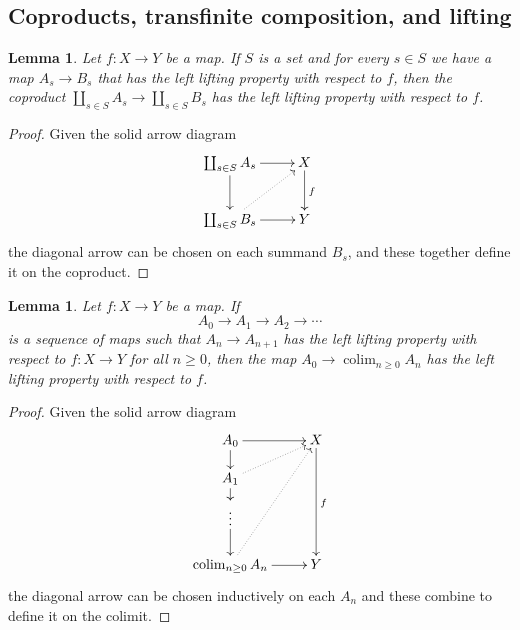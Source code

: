 \documentclass{amsart}
\numberwithin{equation}{section}
\theoremstyle{slplain}
\newtheorem{lem}[equation]{Lemma}
\theoremstyle{definition}
\theoremstyle{remark}
\DeclareMathOperator*{\colim}{colim}
\begin{document}
\subsection{Coproducts, transfinite composition, and lifting}
\label{sec:CoprodLift}

\begin{lem}
  \label{lem:coprodLLP}
  Let $f\colon X \to Y$ be a map.  If $S$ is a set and for every $s
  \in S$ we have a map $A_{s} \to B_{s}$ that has the left lifting
  property with respect to $f$, then the coproduct $\coprod_{s\in S}
  A_{s} \to \coprod_{s\in S} B_{s}$ has the left lifting property with
  respect to $f$.
\end{lem}

\begin{proof}
  Given the solid arrow diagram
  \begin{displaymath}
    \xymatrix{
      {\coprod_{s\in S} A_{s}} \ar[r] \ar[d]
      & {X} \ar[d]^{f}\\
      {\coprod_{s\in S} B_{s}} \ar[r] \ar@{..>}[ur]
      & {Y}
    }
  \end{displaymath}
  the diagonal arrow can be chosen on each summand $B_{s}$, and these
  together define it on the coproduct.
\end{proof}

\begin{lem}
  \label{lem:compLLP}
  Let $f\colon X \to Y$ be a map.  If
  \begin{displaymath}
    A_{0} \to A_{1} \to A_{2} \to \cdots
  \end{displaymath}
  is a sequence of maps such that $A_{n} \to A_{n+1}$ has the left
  lifting property with respect to $f\colon X \to Y$ for all $n \ge
  0$, then the map $A_{0} \to \colim_{n\ge 0} A_{n}$ has the left
  lifting property with respect to $f$.
\end{lem}

\begin{proof}
  Given the solid arrow diagram
  \begin{displaymath}
    \xymatrix@R=3ex{
      {A_{0}} \ar[r] \ar[d]
      & {X} \ar[ddd]^{f}\\
      {A_{1}} \ar[d] \ar@{..>}[ur]\\
      {\vdots} \ar[d]\\
      {\colim_{n\ge 0} A_{n}} \ar[r] \ar@{..>}[uuur]
      & {Y}
    }
  \end{displaymath}
  the diagonal arrow can be chosen inductively on each $A_{n}$ and
  these combine to define it on the colimit.
\end{proof}
\end{document}
